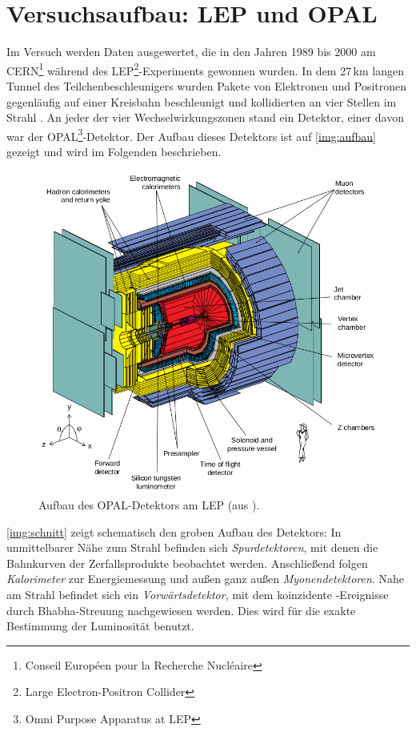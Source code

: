 \section{Versuchsaufbau: LEP und OPAL}
Im Versuch werden Daten ausgewertet, die in den Jahren 1989 bis 2000 am
CERN\footnote{Conseil Européen pour la Recherche Nucléaire} während des
LEP\footnote{Large Electron-Positron Collider}-Experiments gewonnen wurden.
In dem 27\,km langen Tunnel des Teilchenbeschleunigers wurden Pakete von
Elektronen und Positronen gegenläufig auf einer Kreisbahn beschleunigt
und kollidierten an vier Stellen im Strahl \cite{manual}.
An jeder der vier Wechselwirkungszonen stand ein Detektor, einer davon war der
OPAL\footnote{Omni Purpose Apparatus at LEP}-Detektor.
Der Aufbau dieses Detektors ist auf \autoref{img:aufbau} gezeigt und wird im Folgenden beschrieben.

\begin{figure}[H]
    \begin{center}
        \includegraphics[width=\textwidth]{../img/aufbau.png}
        \caption{Aufbau des OPAL-Detektors am LEP (aus \cite{manualmuc}).}
        \label{img:aufbau}
    \end{center}
\end{figure}

\autoref{img:schnitt} zeigt schematisch den groben Aufbau des Detektors:
In unmittelbarer Nähe zum Strahl befinden sich \emph{Spurdetektoren},
mit denen die Bahnkurven der Zerfallsprodukte beobachtet werden.
Anschließend folgen \emph{Kalorimeter} zur Energiemessung und außen ganz außen \emph{Myonendetektoren}.  
Nahe am Strahl befindet sich ein \emph{Vorwärtsdetektor},
mit dem koinzidente \ee-Ereignisse durch Bhabha-Streuung nachgewiesen
werden. Dies wird für die exakte Bestimmung der Luminosität benutzt.

